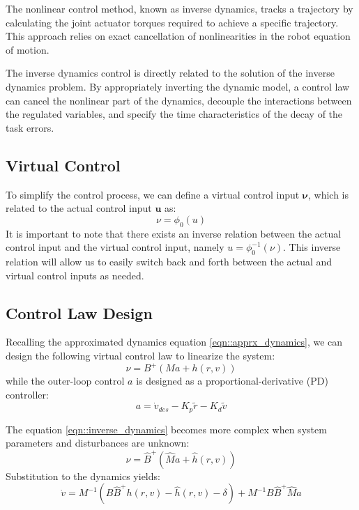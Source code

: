    The nonlinear control method, known as inverse dynamics, tracks a trajectory by calculating 
    the joint actuator torques required to achieve a specific trajectory.
    This approach relies on exact cancellation of nonlinearities in the robot equation of motion.

    The inverse dynamics control is directly related to the solution of the inverse
    dynamics problem. By appropriately inverting the dynamic model, a control law can 
    cancel the nonlinear part of the dynamics, decouple the interactions 
    between the regulated variables, and specify the time characteristics of the decay of the 
    task errors.

    \subsection{Virtual Control}
    To simplify the control process, we can define a virtual control
    input $\boldsymbol{\nu}$, which is related to the actual control input $\mathbf{u}$ 
    as:
    \begin{equation}
        \nu = \phi_0(u)
    \end{equation} 
    It is important to note that there exists an inverse relation between 
    the actual control input and the virtual control input, namely 
    $u = \phi_0^{-1}(\nu)$. 
    This inverse relation will allow us to easily switch back and forth 
    between the actual and virtual control inputs as needed.

    \subsection{Control Law Design}
      Recalling the approximated dynamics equation \ref{eqn::apprx_dynamics}, we can design the following virtual control law to 
    linearize the system:
    \begin{equation}
        \label{eqn::inverse_dynamics}
        \nu = B^{+} (Ma + h(r, v))
    \end{equation}
    while the outer-loop control $a$ is designed as a proportional-derivative (PD) controller:
    \begin{equation}
        a = \dot{v}_{des} - K_p \tilde{r} - K_d \tilde{v}
    \end{equation}

    The equation \ref{eqn::inverse_dynamics} becomes more complex when system parameters and disturbances are 
    unknown:
    \begin{equation}
    \nu = \hat{B}^{+}(\hat{M}a + \hat h(r, v))
    \end{equation}
    Substitution to the dynamics yields:
    \begin{equation}
    \dot{v} = M^{-1}(B\hat{B}^{+}h(r, v) - \hat h(r, v) - \delta) + 
    M^{-1}B\hat{B}^{+}\hat{M}a
    \end{equation}

